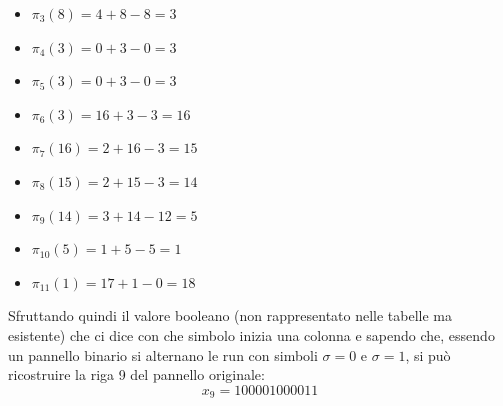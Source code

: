 \begin{esempio}
\begin{multicols}{2}
\begin{itemize}
      \item $\pi_3(8)=4+8-8=3$
      \item $\pi_4(3)=0+3-0=3$
      \item $\pi_5(3)=0+3-0=3$
      \item $\pi_6(3)=16+3-3=16$
      \item $\pi_7(16)=2+16-3=15$
      \item $\pi_8(15)=2+15-3=14$
      \item $\pi_9(14)=3+14-12=5$
      \item $\pi_{10}(5)=1+5-5=1$
      \item $\pi_{11}(1)=17+1-0=18$
    \end{itemize}
  \end{multicols}
  Sfruttando quindi il valore booleano (non rappresentato nelle tabelle ma
  esistente) che ci dice con che simbolo inizia una colonna e sapendo che,
  essendo un pannello binario si alternano le run con simboli $\sigma=0$ e
  $\sigma=1$, si può ricostruire la riga 9 del pannello originale:
  \[x_9=100001000011\]
\end{esempio}

